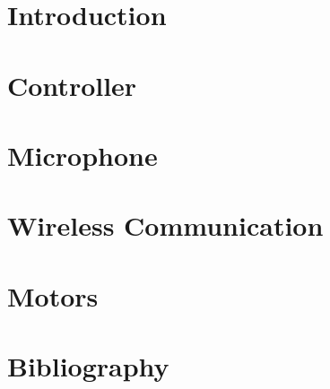 \documentclass{article}
\begin{document}
	
	\newpage
	
	\tableofcontents
	\setcounter{page}{0}
	\newpage
	
	\section{Introduction}
	
	\newpage
	
	\section{Controller}
	
	\newpage
	
	\section{Microphone}
	
	\newpage
	
	\section{Wireless Communication}
	
	\newpage
	
	\section{Motors}
	
	\newpage
	
	\section{Bibliography}
	
	\newpage
	
	
\end{document}
